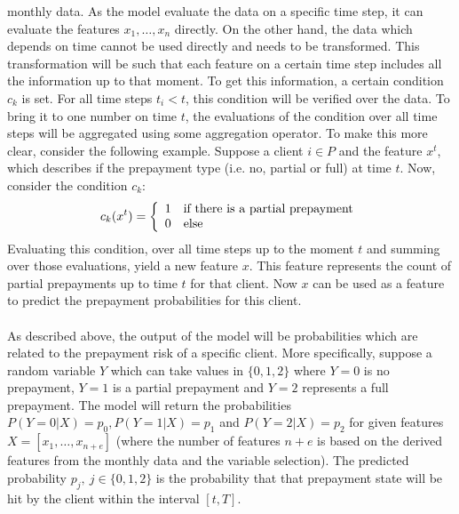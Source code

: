     monthly data. As the model evaluate the data on a specific time step, it can
    evaluate the features $x_1, \ldots, x_n$ directly. On the other hand, the data
    which depends on time cannot be used directly and needs to be transformed.
    This transformation will be such that each feature on a certain time step 
    includes all the information up to that moment. To get this information, a 
    certain condition $c_k$ is set. For all time steps $t_i < t$, this condition 
    will be verified over the data. To bring it to one number on time $t$, the 
    evaluations of the condition over all time steps will be aggregated using some 
    aggregation operator. To make this more clear, consider the following example.
    Suppose a client $i \in P$ and the feature $x^t$, which describes if the 
    prepayment type (i.e. no, partial or full) at time $t$. Now, consider the 
    condition $c_k$:
    \begin{equation}
        c_k(x^t) = \left\{
        \begin{array}{l l l l l}
            1 & \text{if there is a partial prepayment} \\ 
            0 & \text{else}
        \end{array}
        \right.
    \end{equation}
    Evaluating this condition, over all time steps up to the moment $t$ and summing 
    over those evaluations, yield a new feature $x$. This feature represents the count 
    of partial prepayments up to time $t$ for that client. 
    Now $x$ can be used as a feature to predict the prepayment probabilities for 
    this client. 
    \\\\
    As described above, the output of the model will be probabilities which are related 
    to the prepayment risk of a specific client. More specifically, suppose a random 
    variable $Y$ which can take values in $\{0, 1, 2\}$ where $Y=0$ is no prepayment, 
    $Y=1$ is a partial prepayment and $Y=2$ represents a full prepayment. The model 
    will return the probabilities $P(Y = 0 | X) = p_0, P(Y = 1 | X) = p_1$ and 
    $P(Y = 2 | X) = p_2$
    for given features $X = [x_1, \ldots, x_{n+e}]$ (where the number of features 
    $n+e$ is based on the derived features from the monthly data and the variable 
    selection). The predicted probability $p_j, \ j \in \{0, 1, 2\}$ is the probability 
    that that prepayment state will be hit by the client within the interval $[t, T]$. 

